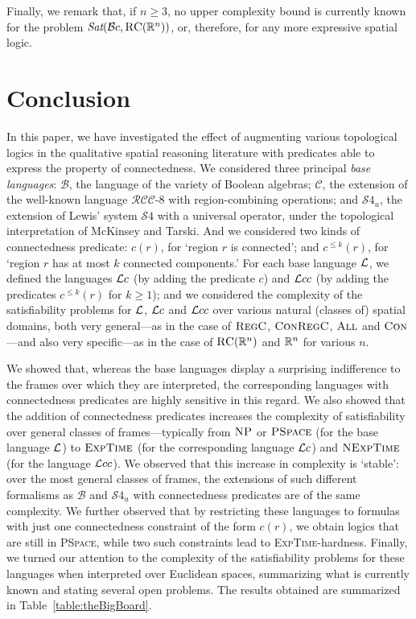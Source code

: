 \documentclass{LMCS}
\theoremstyle{plain}
\newcommand{\cB}{\ensuremath{\mathcal{B}}}\newcommand{\cBc}{\ensuremath{\mathcal{B}c}}\newcommand{\cBcc}{\ensuremath{\mathcal{B}cc}}
\newcommand{\cBC}{\ensuremath{\mathcal{C}}}
\newcommand{\SF}{\ensuremath{\mathcal{S}4}}\newcommand{\SFU}{\ensuremath{\mathcal{S}4_u}}\newcommand{\conT}{\ensuremath{\SFU{}c}}\newcommand{\conTc}{\ensuremath{\SFU{}cc}}
\newcommand{\RCCE}{\ensuremath{\mathcal{RCC}\text{-}8}}\newcommand{\RCCEcc}{\ensuremath{\RCCE{}cc}}\newcommand{\RCCEc}{\ensuremath{\RCCE{}c}}
\newcommand{\Sat}{\textit{Sat}}
\newcommand{\All}{\textsc{All}}
\newcommand{\Regc}{\textsc{RegC}}
\newcommand{\ConR}{\textsc{ConRegC}}
\newcommand{\NP}{\textsc{NP}}
\newcommand{\PSpace}{\textsc{PSpace}}
\newcommand{\ExpTime}{\textsc{ExpTime}}
\newcommand{\NExpTime}{\textsc{NExpTime}}
\begin{document}
Finally, we remark that, if $n \geq 3$, no upper complexity bound is
currently known for the problem $\Sat(\cBc,\RegC(\R^n))$, or,
therefore, for any more expressive spatial logic.


\section{Conclusion}
\label{sec:conclusion}

In this paper, we have investigated the effect of augmenting various
topological logics in the qualitative spatial reasoning literature
with predicates able to express the property of connectedness.  We
considered three principal {\em base languages}: $\cB$, the language of
the variety of Boolean algebras; $\cBC$, the extension of the
well-known language $\RCCE$ with region-combining operations; and
$\SFU$, the extension of Lewis' system $\SF$ with a universal
operator, under the topological interpretation of McKinsey and
Tarski. And we considered two kinds of connectedness predicate:
$c(r)$, for `region $r$ is connected'; and $c^{\le k}(r)$, for `region
$r$ has at most $k$ connected components.'  For each base language
$\mathcal{L}$, we defined the languages $\mathcal{L}c$ (by adding the predicate $c$)
and $\mathcal{L}cc$ (by adding the predicates $c^{\le k}(r)$ for $k\geq 1$);
and we considered the complexity of the satisfiability problems for
$\mathcal{L}$, $\mathcal{L}c$ and $\mathcal{L}cc$ over various natural (classes of) spatial
domains, both very general---as in the case of $\Regc$, $\ConR$,
$\All$ and $\textsc{Con}$---and also very specific---as in the case of
$\textsc{RC}(\mathbb{R}^n)$ and $\mathbb{R}^n$ for various $n$.

We showed that, whereas the base languages display a surprising
indifference to the frames over which they are interpreted,
the corresponding languages with connectedness predicates are highly
sensitive in this regard. We also showed that the addition of
connectedness predicates increases the complexity of satisfiability
over general classes of frames---typically from $\NP$ or
$\PSpace$ (for the base language $\mathcal{L}$) to $\ExpTime$ (for the
corresponding language $\mathcal{L}c$) and $\NExpTime$ (for the language
$\mathcal{L}cc$). We observed that this increase in complexity is `stable':
over the most general classes of frames, the extensions of such
different formalisms as $\cB$ and $\SFU$ with connectedness predicates
are of the same complexity. We further observed that by restricting
these languages to formulas with just one connectedness constraint of
the form $c(r)$, we obtain logics that are still in \PSpace, while two
such constraints lead to \ExpTime-hardness. Finally, we turned our
attention to the complexity of the satisfiability problems for these
languages when interpreted over Euclidean spaces, summarizing what is
currently known and stating several open problems. The results
obtained are summarized in Table~\ref{table:theBigBoard}.
\end{document}
